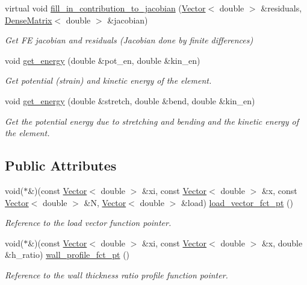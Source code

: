 \begin{DoxyCompactItemize}
virtual void \hyperlink{classoomph_1_1KirchhoffLoveBeamEquations_af335ab12a9b5e870f25516a53b2a7b60}{fill\+\_\+in\+\_\+contribution\+\_\+to\+\_\+jacobian} (\hyperlink{classoomph_1_1Vector}{Vector}$<$ double $>$ \&residuals, \hyperlink{classoomph_1_1DenseMatrix}{Dense\+Matrix}$<$ double $>$ \&jacobian)
\begin{DoxyCompactList}\small\item\em Get FE jacobian and residuals (Jacobian done by finite differences) \end{DoxyCompactList}\item 
void \hyperlink{classoomph_1_1KirchhoffLoveBeamEquations_ac593b9b056f6e89ba4f82ad2d303bdf6}{get\+\_\+energy} (double \&pot\+\_\+en, double \&kin\+\_\+en)
\begin{DoxyCompactList}\small\item\em Get potential (strain) and kinetic energy of the element. \end{DoxyCompactList}\item 
void \hyperlink{classoomph_1_1KirchhoffLoveBeamEquations_ae003c588ad4e314538fcd04c9289a702}{get\+\_\+energy} (double \&stretch, double \&bend, double \&kin\+\_\+en)
\begin{DoxyCompactList}\small\item\em Get the potential energy due to stretching and bending and the kinetic energy of the element. \end{DoxyCompactList}\end{DoxyCompactItemize}
\subsection*{Public Attributes}
\begin{DoxyCompactItemize}
\item 
void($\ast$\&)(const \hyperlink{classoomph_1_1Vector}{Vector}$<$ double $>$ \&xi, const \hyperlink{classoomph_1_1Vector}{Vector}$<$ double $>$ \&x, const \hyperlink{classoomph_1_1Vector}{Vector}$<$ double $>$ \&N, \hyperlink{classoomph_1_1Vector}{Vector}$<$ double $>$ \&load) \hyperlink{classoomph_1_1KirchhoffLoveBeamEquations_a0710dd43c856aaa9c94d3112f8cba7ed}{load\+\_\+vector\+\_\+fct\+\_\+pt} ()
\begin{DoxyCompactList}\small\item\em Reference to the load vector function pointer. \end{DoxyCompactList}\item 
void($\ast$\&)(const \hyperlink{classoomph_1_1Vector}{Vector}$<$ double $>$ \&xi, const \hyperlink{classoomph_1_1Vector}{Vector}$<$ double $>$ \&x, double \&h\+\_\+ratio) \hyperlink{classoomph_1_1KirchhoffLoveBeamEquations_a692f4e893d75223ca5bedbb4ab5a1572}{wall\+\_\+profile\+\_\+fct\+\_\+pt} ()
\begin{DoxyCompactList}\small\item\em Reference to the wall thickness ratio profile function pointer. \end{DoxyCompactList}\end{DoxyCompactItemize}
